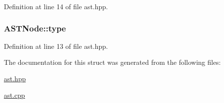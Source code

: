 Definition at line 14 of file ast.\+hpp.

\hypertarget{struct_a_s_t_node_a34086f3bc5af008f08f255c8ec57ba21}{}
\subsubsection[{type}]{ A\+S\+T\+Node\+::type}\label{struct_a_s_t_node_a34086f3bc5af008f08f255c8ec57ba21}


Definition at line 13 of file ast.\+hpp.



The documentation for this struct was generated from the following files\+:\begin{DoxyCompactItemize}
\item 
\hyperlink{ast_8hpp}{ast.\+hpp}\item 
\hyperlink{ast_8cpp}{ast.\+cpp}\end{DoxyCompactItemize}
